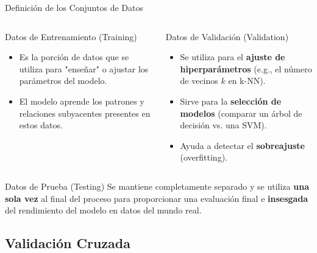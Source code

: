 \documentclass[aspectratio=169,xcolor=dvipsnames]{beamer}
\begin{document}
\begin{frame}{Definición de los Conjuntos de Datos}
    \begin{columns}[t]
            \begin{block}{Datos de Entrenamiento (Training)}
                \begin{itemize}
                    \item Es la porción de datos que se utiliza para "enseñar" o ajustar los parámetros del modelo.
                    \item El modelo aprende los patrones y relaciones subyacentes presentes en estos datos.
                \end{itemize}
            \end{block}

            \begin{alertblock}{Datos de Validación (Validation)}
                 \begin{itemize}
                    \item Se utiliza para el \textbf{ajuste de hiperparámetros} (e.g., el número de vecinos $k$ en k-NN).
                    \item Sirve para la \textbf{selección de modelos} (comparar un árbol de decisión vs. una SVM).
                    \item Ayuda a detectar el \textbf{sobreajuste} (overfitting).
                \end{itemize}
            \end{alertblock}
    \end{columns}
    
    \begin{examples}{Datos de Prueba (Testing)}
    Se mantiene completamente separado y se utiliza \textbf{una sola vez} al final del proceso para proporcionar una evaluación final e \textbf{insesgada} del rendimiento del modelo en datos del mundo real.
    \end{examples}
\end{frame}

\subsection{Validación Cruzada}
\end{document}
